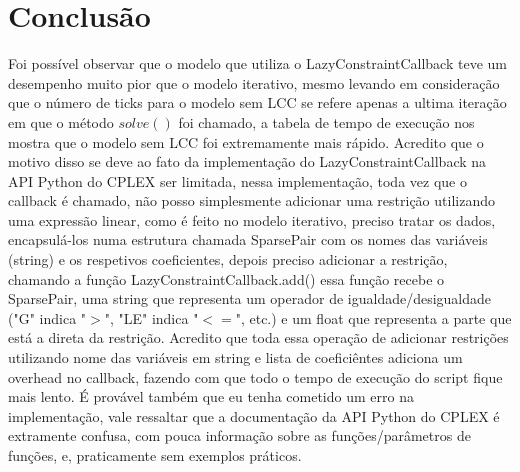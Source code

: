 \documentclass{article}
\begin{document}
    \section{Conclusão}
    Foi possível observar que o modelo que utiliza o LazyConstraintCallback teve um desempenho muito pior que o modelo iterativo,
    mesmo levando em consideração que o número de ticks para o modelo sem LCC se refere apenas a ultima iteração em que o método $solve()$
    foi chamado, a tabela de tempo de execução nos mostra que o modelo sem LCC foi extremamente mais rápido.
    Acredito que o motivo disso se deve ao fato da implementação do LazyConstraintCallback na API Python do CPLEX ser limitada,
    nessa implementação, toda vez que o callback é chamado, não posso simplesmente adicionar uma restrição utilizando uma expressão
    linear, como é feito no modelo iterativo, preciso tratar os dados, encapsulá-los numa estrutura chamada SparsePair com os nomes
    das variáveis (string) e os respetivos coeficientes, depois preciso adicionar a restrição, chamando a função LazyConstraintCallback.add()
    essa função recebe o SparsePair, uma string que representa um operador de igualdade/desigualdade ("G" indica "$>$", "LE" indica "$<=$", etc.)
    e um float que representa a parte que está a direta da restrição.
    Acredito que toda essa operação de adicionar restrições utilizando nome das variáveis em string e lista de coeficiêntes adiciona um overhead
    no callback, fazendo com que todo o tempo de execução do script fique mais lento.
    É provável também que eu tenha cometido um erro na implementação, vale ressaltar que a documentação da API Python do CPLEX é extramente confusa,
    com pouca informação sobre as funções/parâmetros de funções, e, praticamente sem exemplos práticos.
\end{document}
